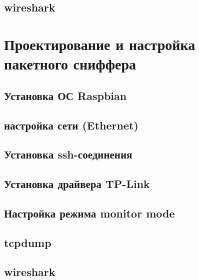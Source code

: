 \subsection{wireshark}
%


\section{Проектирование и настройка пакетного сниффера}
\setcounter{figure}{0}
\subsection{Установка ОС Raspbian}
%
\subsection{настройка сети (Ethernet)}

\subsection{Установка ssh-соединения}

\subsection{Установка драйвера TP-Link}

\subsection{Настройка режима monitor mode}

\subsection{tcpdump}
%
\subsection{wireshark}
%






\clearpage
\renewcommand{\refname}{Список использованных источников}






